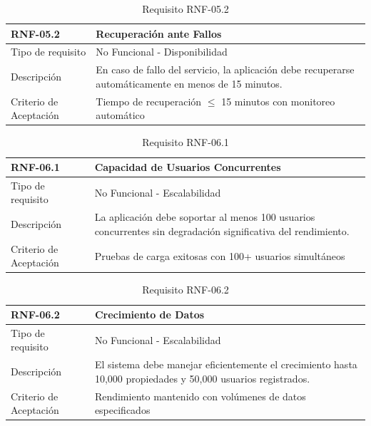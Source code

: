\begin{table}[H]
\centering
\begin{tabular}{|p{3cm}|p{10cm}|}
\hline
\rowcolor{tealblue}
{\textbf{RNF-05.2}} & {\textbf{Recuperación ante Fallos}} \\
\hline
Tipo de requisito & No Funcional - Disponibilidad \\
\hline
Descripción & En caso de fallo del servicio, la aplicación debe recuperarse automáticamente en menos de 15 minutos. \\
\hline
Criterio de Aceptación & Tiempo de recuperación $\leq$ 15 minutos con monitoreo automático \\
\hline
\end{tabular}
\caption{Requisito RNF-05.2}
\end{table}


\begin{table}[H]
\centering
\begin{tabular}{|p{3cm}|p{10cm}|}
\hline
\rowcolor{tealblue}
{\textbf{RNF-06.1}} & {\textbf{Capacidad de Usuarios Concurrentes}} \\
\hline
Tipo de requisito & No Funcional - Escalabilidad \\
\hline
Descripción & La aplicación debe soportar al menos 100 usuarios concurrentes sin degradación significativa del rendimiento. \\
\hline
Criterio de Aceptación & Pruebas de carga exitosas con 100+ usuarios simultáneos \\
\hline
\end{tabular}
\caption{Requisito RNF-06.1}
\end{table}

\begin{table}[H]
\centering
\begin{tabular}{|p{3cm}|p{10cm}|}
\hline
\rowcolor{tealblue}
{\textbf{RNF-06.2}} & {\textbf{Crecimiento de Datos}} \\
\hline
Tipo de requisito & No Funcional - Escalabilidad \\
\hline
Descripción & El sistema debe manejar eficientemente el crecimiento hasta 10,000 propiedades y 50,000 usuarios registrados. \\
\hline
Criterio de Aceptación & Rendimiento mantenido con volúmenes de datos especificados \\
\hline
\end{tabular}
\caption{Requisito RNF-06.2}
\end{table}

